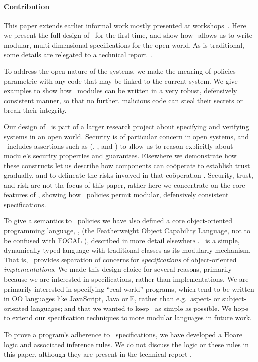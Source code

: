  




\paragraph{Contribution} 
This paper extends earlier informal work mostly presented at
workshops~\cite{capeFTfJP,capeFTfJP14,swapsiesOnTheInternet2015,capeIFM14}.
Here we present the full design of \Chainmail\ for the first time, and
show how \Chainmail\ allows us to write modular, multi-dimensional
specifications for the open world.  As is traditional, some details
are relegated to a technical report~\cite{appendix}.

To address the open nature of the systems, we make the meaning of
policies parametric with any code that may be linked to the
current system.  We give examples to show how \Chainmail\ modules can
be written in a very robust, defensively consistent manner, so that no
further, malicious code can steal their secrets or break their
integrity.


Our design of \Chainmail\ is part of a larger research project about
specifying and verifying systems in an open world.  Security is of
particular concern in open systems, and \Chainmail\ includes
assertions such as (\obeys, \MayAffect, and \MayAccess) to allow
us to reason explicitly about module's security properties and
guarantees.  Elsewhere we demonstrate how these constructs let us
describe how components can co{\"o}perate to establish trust
gradually, and to delineate the risks involved in that co{\"o}peration
\cite{POSTSUBMITTED}. Security, trust, and risk are not the focus of
this paper, rather here we concentrate on the core features of
\Chainmail, showing how \Chainmail\ policies permit modular,
defensively consistent specifications.

To give a semantics to \Chainmail\ policies we have also defined a
core object-oriented programming language, \LangOO, (the Featherweight
Object Capability Language, not to be confused with FOCAL
\cite{FOCAL-69}), described in more detail elsewhere \cite{appendix}.
\LangOO\ is a simple, dynamically typed language with traditional
classes as its modularly mechanism.  That is, \Chainmail\ provides
separation of concerns for \emph{specifications} of object-oriented
\emph{implementations}.  We made this design choice for several
reasons, primarily because we are interested in specifications, rather
than implementations.  We are primarily
interested in specifying ``real world'' programs, which tend to be
written in OO languages like JavaScript, Java or E, rather than e.g.\
aspect- or subject- oriented languages; and that we wanted to keep
\LangOO\ as simple as possible.  We hope to extend our specification
techniques to more modular languages in future work.

To prove a program's adherence to \Chainmail\ specifications, we have
developed a Hoare logic and associated inference rules.  We do not
discuss the logic or these rules in this paper, although they are
present in the technical report \cite{appendix}.
 
